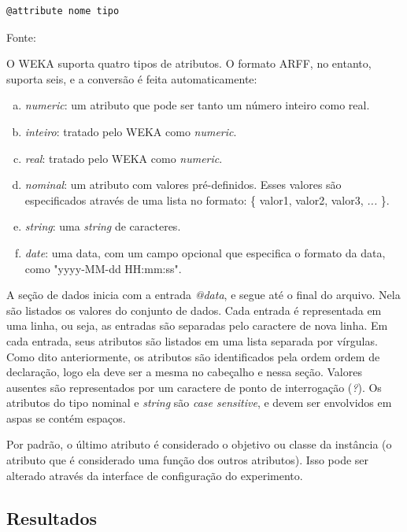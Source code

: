 \vspace{0.5cm}
\begin{lstlisting}[caption=Formato de uma entrada \emph{@attribute}, label=lst:prop_attribute_out]
@attribute nome tipo
\end{lstlisting}
\vspace{0.25cm}
\centerline{Fonte: \cite{Hall2009}}
\vspace{0.5cm}

O WEKA suporta quatro tipos de atributos. O formato ARFF, no entanto, suporta seis, e a conversão é feita automaticamente:

\begin{enumerate}[a)]
    \item \emph{numeric}: um atributo que pode ser tanto um número inteiro como real.
    \item \emph{inteiro}: tratado pelo WEKA como \emph{numeric}.
    \item \emph{real}: tratado pelo WEKA como \emph{numeric}.
    \item \emph{nominal}: um atributo com valores pré-definidos. Esses valores são especificados através de uma lista no formato: \{ valor1, valor2, valor3, \emph{...} \}.
    \item \emph{string}: uma \emph{string} de caracteres.
    \item \emph{date}: uma data, com um campo opcional que especifica o formato da data, como "yyyy-MM-dd HH:mm:ss".
\end{enumerate}

A seção de dados inicia com a entrada \emph{@data}, e segue até o final do arquivo. Nela são listados os valores do conjunto de dados. Cada entrada é representada em uma linha, ou seja, as entradas são separadas pelo caractere de nova linha. Em cada entrada, seus atributos são listados em uma lista separada por vírgulas. Como dito anteriormente, os atributos são identificados pela ordem ordem de declaração, logo ela deve ser a mesma no cabeçalho e nessa seção. Valores ausentes são representados por um caractere de ponto de interrogação (\emph{?}). Os atributos do tipo nominal e \emph{string} são \emph{case sensitive}, e devem ser envolvidos em aspas se contém espaços.

Por padrão, o último atributo é considerado o objetivo ou classe da instância (o atributo que é considerado uma função dos outros atributos). Isso pode ser alterado através da interface de configuração do experimento.

\subsection{Resultados}
\label{sec:prop_results}

